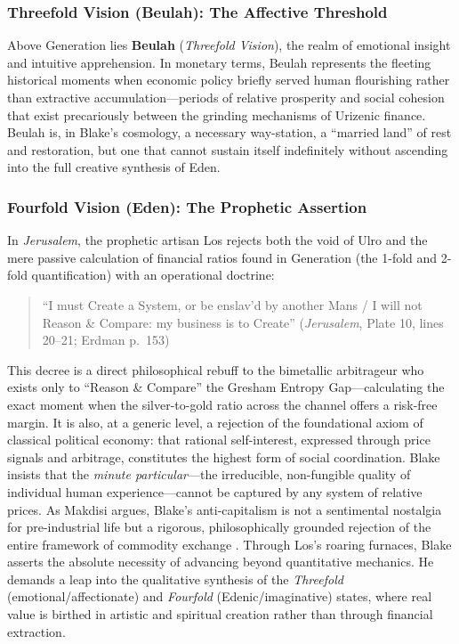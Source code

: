 \documentclass[
]{article}
\begin{document}
\subsubsection{Threefold Vision (Beulah): The Affective
Threshold}\label{threefold-vision-beulah-the-affective-threshold}

Above Generation lies \textbf{Beulah} (\emph{Threefold Vision}), the
realm of emotional insight and intuitive apprehension. In monetary
terms, Beulah represents the fleeting historical moments when economic
policy briefly served human flourishing rather than extractive
accumulation---periods of relative prosperity and social cohesion that
exist precariously between the grinding mechanisms of Urizenic finance.
Beulah is, in Blake's cosmology, a necessary way-station, a ``married
land'' of rest and restoration, but one that cannot sustain itself
indefinitely without ascending into the full creative synthesis of Eden.

\subsubsection{Fourfold Vision (Eden): The Prophetic
Assertion}\label{fourfold-vision-eden-the-prophetic-assertion}

In \emph{Jerusalem}, the prophetic artisan Los rejects both the void of
Ulro and the mere passive calculation of financial ratios found in
Generation (the 1-fold and 2-fold quantification) with an operational
doctrine:

\begin{quote}
``I must Create a System, or be enslav'd by another Mans / I will not
Reason \& Compare: my business is to Create'' (\emph{Jerusalem}, Plate
10, lines 20--21; Erdman p.~153) \citep{erdman1988complete}
\end{quote}

This decree is a direct philosophical rebuff to the bimetallic
arbitrageur who exists only to ``Reason \& Compare'' the Gresham Entropy
Gap---calculating the exact moment when the silver-to-gold ratio across
the channel offers a risk-free margin. It is also, at a generic level, a
rejection of the foundational axiom of classical political economy: that
rational self-interest, expressed through price signals and arbitrage,
constitutes the highest form of social coordination. Blake insists that
the \emph{minute particular}---the irreducible, non-fungible quality of
individual human experience---cannot be captured by any system of
relative prices. As Makdisi argues, Blake's anti-capitalism is not a
sentimental nostalgia for pre-industrial life but a rigorous,
philosophically grounded rejection of the entire framework of commodity
exchange \citep{makdisi2003william}. Through Los's roaring furnaces,
Blake asserts the absolute necessity of advancing beyond quantitative
mechanics. He demands a leap into the qualitative synthesis of the
\emph{Threefold} (emotional/affectionate) and \emph{Fourfold}
(Edenic/imaginative) states, where real value is birthed in artistic and
spiritual creation rather than through financial extraction.
\end{document}
